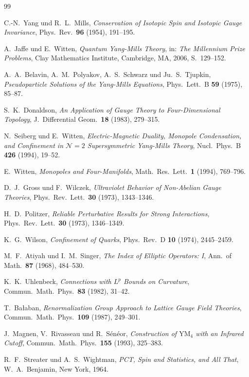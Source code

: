 \documentclass[12pt,a4paper]{amsart}
\theoremstyle{definition}
\theoremstyle{remark}
\begin{document}
\begin{thebibliography}{99}

C.-N.\ Yang und R.\ L.\ Mills,
\textit{Conservation of Isotopic Spin and Isotopic Gauge Invariance},
Phys.\ Rev.\ \textbf{96} (1954), 191--195.

A.\ Jaffe und E.\ Witten,
\textit{Quantum Yang-Mills Theory},
in: \textit{The Millennium Prize Problems},
Clay Mathematics Institute, Cambridge, MA, 2006, S.\ 129--152.

A.\ A.\ Belavin, A.\ M.\ Polyakov, A.\ S.\ Schwarz und Ju.\ S.\ Tjupkin,
\textit{Pseudoparticle Solutions of the Yang-Mills Equations},
Phys.\ Lett.\ B \textbf{59} (1975), 85--87.

S.\ K.\ Donaldson,
\textit{An Application of Gauge Theory to Four-Dimensional Topology},
J.\ Differential Geom.\ \textbf{18} (1983), 279--315.

N.\ Seiberg und E.\ Witten,
\textit{Electric-Magnetic Duality, Monopole Condensation, and Confinement in
$\mathcal{N}=2$ Supersymmetric Yang-Mills Theory},
Nucl.\ Phys.\ B \textbf{426} (1994), 19--52.

E.\ Witten,
\textit{Monopoles and Four-Manifolds},
Math.\ Res.\ Lett.\ \textbf{1} (1994), 769--796.

D.\ J.\ Gross und F.\ Wilczek,
\textit{Ultraviolet Behavior of Non-Abelian Gauge Theories},
Phys.\ Rev.\ Lett.\ \textbf{30} (1973), 1343--1346.

H.\ D.\ Politzer,
\textit{Reliable Perturbative Results for Strong Interactions},
Phys.\ Rev.\ Lett.\ \textbf{30} (1973), 1346--1349.

K.\ G.\ Wilson,
\textit{Confinement of Quarks},
Phys.\ Rev.\ D \textbf{10} (1974), 2445--2459.

M.\ F.\ Atiyah und I.\ M.\ Singer,
\textit{The Index of Elliptic Operators: I},
Ann.\ of Math.\ \textbf{87} (1968), 484--530.

K.\ K.\ Uhlenbeck,
\textit{Connections with $L^p$ Bounds on Curvature},
Commun.\ Math.\ Phys.\ \textbf{83} (1982), 31--42.

T.\ Bała{}ban,
\textit{Renormalization Group Approach to Lattice Gauge Field Theories},
Commun.\ Math.\ Phys.\ \textbf{109} (1987), 249--301.

J.\ Magnen, V.\ Rivasseau und R.\ Sénéor,
\textit{Construction of $\mathrm{YM}_4$ with an Infrared Cutoff},
Commun.\ Math.\ Phys.\ \textbf{155} (1993), 325--383.

R.\ F.\ Streater und A.\ S.\ Wightman,
\textit{PCT, Spin and Statistics, and All That},
W.\ A.\ Benjamin, New York, 1964.

\end{thebibliography}
\end{document}

